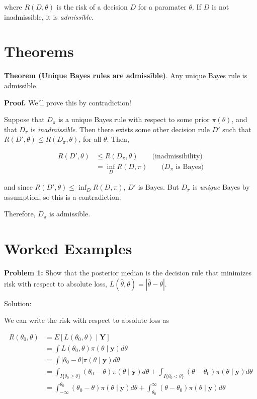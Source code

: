 \documentclass[
  letterpaper,
  DIV=11,
  numbers=noendperiod]{scrreprt}
\begin{document}
where \(R(D, \theta)\) is the risk of a decision \(D\) for a paramater
\(\theta\). If \(D\) is not inadmissible, it is \emph{admissible}.

\section{Theorems}\label{theorems-8}

\textbf{Theorem (Unique Bayes rules are admissible)}. Any unique Bayes
rule is admissible.

\textbf{Proof.} We'll prove this by contradiction!

Suppose that \(D_\pi\) is a unique Bayes rule with respect to some prior
\(\pi(\theta)\), and that \(D_\pi\) is \emph{inadmissible}. Then there
exists some other decision rule \(D'\) such that
\(R(D', \theta) \leq R(D_\pi, \theta)\), for all \(\theta\). Then,

\begin{align*}
    R(D', \theta) & \leq R(D_{\pi}, \theta) \quad \quad \text{(inadmissibility)} \\
    & = \inf_D R(D, \pi) \quad \quad \text{($D_\pi$ is Bayes)}
\end{align*}

and since \(R(D', \theta) \leq \inf_D R(D, \pi)\), \(D'\) is Bayes. But
\(D_\pi\) is \emph{unique} Bayes by assumption, so this is a
contradiction.

Therefore, \(D_\pi\) is admissible.

\section{Worked Examples}\label{worked-examples-8}

\textbf{Problem 1:} Show that the posterior median is the decision rule
that minimizes risk with respect to absolute loss,
\(L(\hat{\theta}, \theta) = |\hat{\theta} - \theta|\).

Solution:

We can write the risk with respect to absolute loss as

\begin{align*}
    R(\theta_0, \theta) & = E[L(\theta_0, \theta) \mid \textbf{Y}] \\
    & = \int L(\theta_0, \theta) \pi(\theta \mid \textbf{y}) d\theta \\
    & = \int |\theta_0 - \theta| \pi(\theta \mid \textbf{y}) d\theta \\
    & = \int_{I\{\theta_0 \geq \theta \}} \left( \theta_0 - \theta \right) \pi(\theta \mid \textbf{y}) d\theta + \int_{I\{\theta_0 < \theta \}} \left(  \theta - \theta_0 \right) \pi(\theta \mid \textbf{y}) d\theta \\
    & = \int_{-\infty}^{\theta_0} \left( \theta_0 - \theta \right) \pi(\theta \mid \textbf{y}) d\theta + \int_{\theta_0}^\infty \left( \theta - \theta_0 \right) \pi(\theta \mid \textbf{y}) d\theta
\end{align*}
\end{document}
